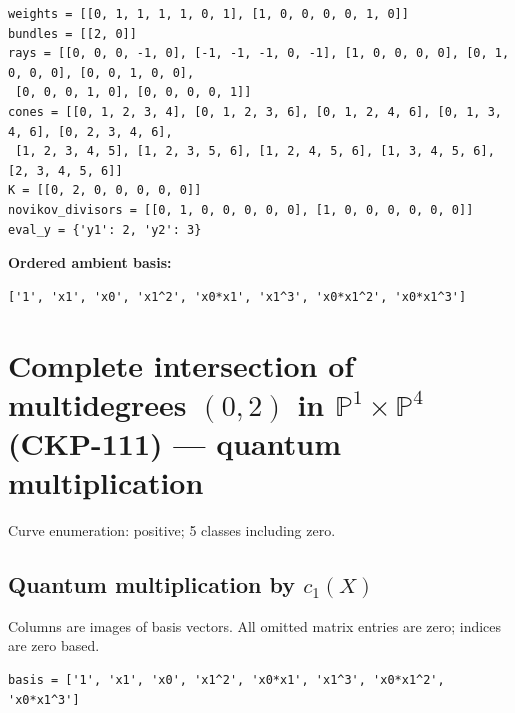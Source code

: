 \documentclass[10pt,a4paper]{article}
\begin{document}
\begin{lstlisting}
weights = [[0, 1, 1, 1, 1, 0, 1], [1, 0, 0, 0, 0, 1, 0]]
bundles = [[2, 0]]
rays = [[0, 0, 0, -1, 0], [-1, -1, -1, 0, -1], [1, 0, 0, 0, 0], [0, 1, 0, 0, 0], [0, 0, 1, 0, 0],
 [0, 0, 0, 1, 0], [0, 0, 0, 0, 1]]
cones = [[0, 1, 2, 3, 4], [0, 1, 2, 3, 6], [0, 1, 2, 4, 6], [0, 1, 3, 4, 6], [0, 2, 3, 4, 6],
 [1, 2, 3, 4, 5], [1, 2, 3, 5, 6], [1, 2, 4, 5, 6], [1, 3, 4, 5, 6], [2, 3, 4, 5, 6]]
K = [[0, 2, 0, 0, 0, 0, 0]]
novikov_divisors = [[0, 1, 0, 0, 0, 0, 0], [1, 0, 0, 0, 0, 0, 0]]
eval_y = {'y1': 2, 'y2': 3}
\end{lstlisting}

\textbf{Ordered ambient basis:}
\begin{lstlisting}
['1', 'x1', 'x0', 'x1^2', 'x0*x1', 'x1^3', 'x0*x1^2', 'x0*x1^3']
\end{lstlisting}

\clearpage\section*{Complete intersection of multidegrees $(0,2)$ in $\mathbb P^{1}\times \mathbb P^{4}$ (CKP-111) --- quantum multiplication}

Curve enumeration: positive; 5 classes including zero.
\subsection*{Quantum multiplication by $c_1(X)$}
Columns are images of basis vectors. All omitted matrix entries are zero; indices are zero based.

\begin{lstlisting}
basis = ['1', 'x1', 'x0', 'x1^2', 'x0*x1', 'x1^3', 'x0*x1^2', 'x0*x1^3']
\end{lstlisting}
\end{document}
